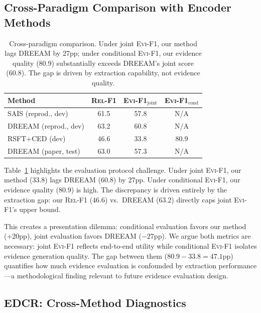 \documentclass[11pt,a4paper]{article}
\newcommand{\evi}{\textsc{Evi-F1}}
\newcommand{\edcr}{\textsc{EDCR}}
\newcommand{\relf}{\textsc{Rel-F1}}
\begin{document}
\subsection{Cross-Paradigm Comparison with Encoder Methods}
\label{sec:protocol}

\begin{table}[t]
\centering
\small
\begin{tabular}{lccc}
\toprule
\textbf{Method} & \textbf{\relf{}} & \textbf{\evi{}$_\text{joint}$} & \textbf{\evi{}$_\text{cond}$} \\
\midrule
SAIS (reprod., dev) & 61.5 & 57.8 & N/A \\
DREEAM (reprod., dev) & 63.2 & 60.8 & N/A \\
RSFT+CED (dev) & 46.6 & 33.8 & 80.9 \\
DREEAM (paper, test) & 63.0 & 57.3 & N/A \\
\bottomrule
\end{tabular}
\caption{Cross-paradigm comparison. Under joint \evi{}, our method lags DREEAM by 27pp; under conditional \evi{}, our evidence quality (80.9) substantially exceeds DREEAM's joint score (60.8). The gap is driven by extraction capability, not evidence quality.}
\label{tab:dreeam}
\end{table}

Table~\ref{tab:dreeam} highlights the evaluation protocol challenge. Under joint \evi{}, our method (33.8) lags DREEAM (60.8) by 27pp. Under conditional \evi{}, our evidence quality (80.9) is high. The discrepancy is driven entirely by the extraction gap: our \relf{} (46.6) vs.\ DREEAM (63.2) directly caps joint \evi{}'s upper bound.

This creates a presentation dilemma: conditional evaluation favors our method (+20pp), joint evaluation favors DREEAM ($-27$pp). We argue both metrics are necessary: joint \evi{} reflects end-to-end utility while conditional \evi{} isolates evidence generation quality. The gap between them ($80.9 - 33.8 = 47.1$pp) quantifies how much evidence evaluation is confounded by extraction performance---a methodological finding relevant to future evidence evaluation design.

\subsection{\edcr{}: Cross-Method Diagnostics}
\label{sec:edcr_cross}
\end{document}
